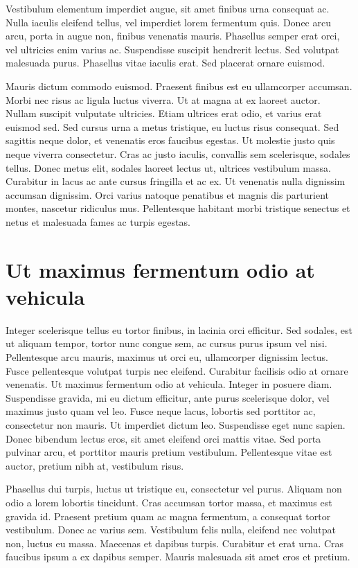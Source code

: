 Vestibulum elementum imperdiet augue, sit amet finibus urna consequat ac. Nulla iaculis eleifend tellus, vel imperdiet lorem fermentum quis. Donec arcu arcu, porta in augue non, finibus venenatis mauris. Phasellus semper erat orci, vel ultricies enim varius ac. Suspendisse suscipit hendrerit lectus. Sed volutpat malesuada purus. Phasellus vitae iaculis erat. Sed placerat ornare euismod.

Mauris dictum commodo euismod. Praesent finibus est eu ullamcorper accumsan. Morbi nec risus ac ligula luctus viverra. Ut at magna at ex laoreet auctor. Nullam suscipit vulputate ultricies. Etiam ultrices erat odio, et varius erat euismod sed. Sed cursus urna a metus tristique, eu luctus risus consequat. Sed sagittis neque dolor, et venenatis eros faucibus egestas. Ut molestie justo quis neque viverra consectetur. Cras ac justo iaculis, convallis sem scelerisque, sodales tellus. Donec metus elit, sodales laoreet lectus ut, ultrices vestibulum massa. Curabitur in lacus ac ante cursus fringilla et ac ex. Ut venenatis nulla dignissim accumsan dignissim. Orci varius natoque penatibus et magnis dis parturient montes, nascetur ridiculus mus. Pellentesque habitant morbi tristique senectus et netus et malesuada fames ac turpis egestas.

\section{Ut maximus fermentum odio at vehicula}
Integer scelerisque tellus eu tortor finibus, in lacinia orci efficitur. Sed sodales, est ut aliquam tempor, tortor nunc congue sem, ac cursus purus ipsum vel nisi. Pellentesque arcu mauris, maximus ut orci eu, ullamcorper dignissim lectus. Fusce pellentesque volutpat turpis nec eleifend. Curabitur facilisis odio at ornare venenatis. Ut maximus fermentum odio at vehicula. Integer in posuere diam. Suspendisse gravida, mi eu dictum efficitur, ante purus scelerisque dolor, vel maximus justo quam vel leo. Fusce neque lacus, lobortis sed porttitor ac, consectetur non mauris. Ut imperdiet dictum leo. Suspendisse eget nunc sapien. Donec bibendum lectus eros, sit amet eleifend orci mattis vitae. Sed porta pulvinar arcu, et porttitor mauris pretium vestibulum. Pellentesque vitae est auctor, pretium nibh at, vestibulum risus.

Phasellus dui turpis, luctus ut tristique eu, consectetur vel purus. Aliquam non odio a lorem lobortis tincidunt. Cras accumsan tortor massa, et maximus est gravida id. Praesent pretium quam ac magna fermentum, a consequat tortor vestibulum. Donec ac varius sem. Vestibulum felis nulla, eleifend nec volutpat non, luctus eu massa. Maecenas et dapibus turpis. Curabitur et erat urna. Cras faucibus ipsum a ex dapibus semper. Mauris malesuada sit amet eros et pretium.

